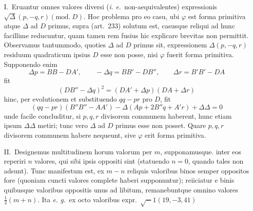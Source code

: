 I.\ Eruantur omnes valores diversi (\textit{i. e.}\ non-aequivalentes) expressionis
$\surd\Delta(p,\allowbreak -q,\allowbreak r)(\mathrm{mod.}\ D)$. Hoc problema pro eo casu, ubi $\varphi$
est forma primitiva atque $\Delta$ ad $D$ primus, supra (art.\ 233) solutum est,
casusque reliqui ad hunc facillime reducuntur, quam tamen rem fusius hic
explicare brevitas non permittit. Observamus tantummodo, quoties $\Delta$ ad
$D$ primus sit, expressionem $\Delta(p,-q,r)$ residuum quadraticum ipsius $D$
esse non posse, nisi $\varphi$ fuerit forma primitiva. Supponendo enim
\[
\Delta p=BB-DA',\qquad -\Delta q=BB'-DB'',\qquad \Delta r=B'B'-DA
\]
fit
\[
(DB''-\Delta q)^2=(DA'+\Delta p)(DA+\Delta r)
\]
hinc, per evolutionem et substituendo $qq-pr$ pro $D$, fit
\[
(qq-pr)(B''B''-AA')-\Delta(Ap+2B''q+A'r)+\Delta\Delta=0
\]
unde facile concluditur, si $p,q,r$ divisorem communem haberent, hunc etiam
ipsum $\Delta\Delta$ metiri; tunc vero $\Delta$ ad $D$ primus esse non posset.
Quare $p,q,r$ divisorem communem habere nequeunt, sive $\varphi$ erit forma
primitiva.

II.\ Designemus multitudinem horum valorum per $m$, supponamusque.
inter eos reperiri $n$ valores, qui sibi ipsis oppositi sint (statuendo $n=0$,
quando tales non adsunt). Tunc manifestum est, ex $m-n$ reliquis valoribus binos
semper oppositos fore (quoniam cuncti valores complete haberi supponuntur);
reiiciatur e binis quibusque valoribus oppositis unus ad libitum, remanebuntque
omnino valores $\frac{1}{2}(m+n)$. Ita \textit{e. g.}\ ex octo valoribus expr.\
$\surd-1(19,-3,41)$

